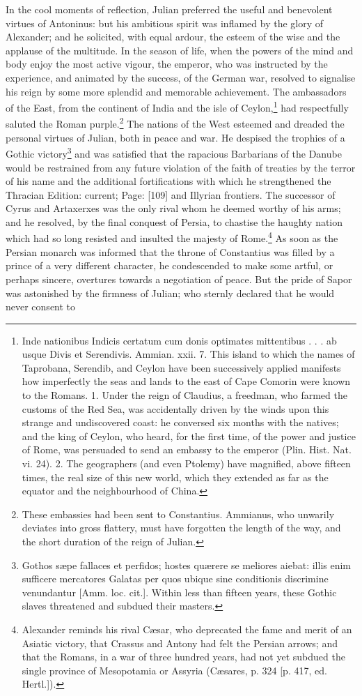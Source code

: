 In the cool moments of reflection, Julian preferred the useful and benevolent virtues of Antoninus: but his ambitious spirit was inflamed by the glory of Alexander; and he solicited, with equal ardour, the esteem of the wise and the applause of the multitude. In the season of life, when the powers of the mind and body enjoy the most active vigour, the emperor, who was instructed by the experience, and animated by the success, of the German war, resolved to signalise his reign by some more splendid and memorable achievement. The ambassadors of the East, from the continent of India and the isle of Ceylon,\footnote{Inde nationibus Indicis certatum cum donis optimates mittentibus . . . ab usque Divis et Serendivis. Ammian. xxii. 7. This island to which the names of Taprobana, Serendib, and Ceylon have been successively applied manifests how imperfectly the seas and lands to the east of Cape Comorin were known to the Romans. 1. Under the reign of Claudius, a freedman, who farmed the customs of the Red Sea, was accidentally driven by the winds upon this strange and undiscovered coast: he conversed six months with the natives; and the king of Ceylon, who heard, for the first time, of the power and justice of Rome, was persuaded to send an embassy to the emperor (Plin. Hist. Nat. vi. 24). 2. The geographers (and even Ptolemy) have magnified, above fifteen times, the real size of this new world, which they extended as far as the equator and the neighbourhood of China.} had respectfully saluted the Roman purple.\footnote{These embassies had been sent to Constantius. Ammianus, who unwarily deviates into gross flattery, must have forgotten the length of the way, and the short duration of the reign of Julian.} The nations of the West esteemed and dreaded the personal virtues of Julian, both in peace and war. He despised the trophies of a Gothic victory\footnote{Gothos sæpe fallaces et perfidos; hostes quærere se meliores aiebat: illis enim sufficere mercatores Galatas per quos ubique sine conditionis discrimine venundantur [Amm. loc. cit.]. Within less than fifteen years, these Gothic slaves threatened and subdued their masters.} and was satisfied that the rapacious Barbarians of the Danube would be restrained from any future violation of the faith of treaties by the terror of his name and the additional fortifications with which he strengthened the Thracian Edition: current; Page: [109] and Illyrian frontiers. The successor of Cyrus and Artaxerxes was the only rival whom he deemed worthy of his arms; and he resolved, by the final conquest of Persia, to chastise the haughty nation which had so long resisted and insulted the majesty of Rome.\footnote{Alexander reminds his rival Cæsar, who deprecated the fame and merit of an Asiatic victory, that Crassus and Antony had felt the Persian arrows; and that the Romans, in a war of three hundred years, had not yet subdued the single province of Mesopotamia or Assyria (Cæsares, p. 324 [p. 417, ed. Hertl.]).} As soon as the Persian monarch was informed that the throne of Constantius was filled by a prince of a very different character, he condescended to make some artful, or perhaps sincere, overtures towards a negotiation of peace. But the pride of Sapor was astonished by the firmness of Julian; who sternly declared that he would never consent to 